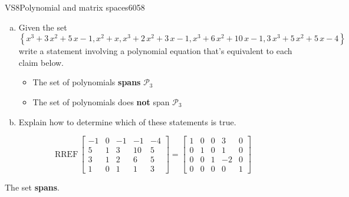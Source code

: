 \begin{exercise}{VS8}{Polynomial and matrix spaces}{6058} 
\begin{exerciseStatement} 

\begin{enumerate}[(a)]
\item  

 Given the set \[\left\{ x^{3} + 3 \, x^{2} + 5 \, x - 1 , x^{2} + x , x^{3} + 2 \, x^{2} + 3 \, x - 1 , x^{3} + 6 \, x^{2} + 10 \, x - 1 , 3 \, x^{3} + 5 \, x^{2} + 5 \, x - 4 \right\}\] write a statement involving a polynomial equation that's equivalent to each claim below. 

 

\begin{itemize}
\item  

 The set of polynomials \textbf{spans} \(\mathcal{P}_3\) 

 
\item  

 The set of polynomials does \textbf{not} span \(\mathcal{P}_3\) 

 
\end{itemize}

     
\item  

 Explain how to determine which of these statements is true. 

 
\end{enumerate}

     \end{exerciseStatement}
 \begin{exerciseAnswer} 

 \[
\mathrm{RREF}\, \left[\begin{array}{ccccc}
-1 & 0 & -1 & -1 & -4 \\
5 & 1 & 3 & 10 & 5 \\
3 & 1 & 2 & 6 & 5 \\
1 & 0 & 1 & 1 & 3
\end{array}\right] = \left[\begin{array}{ccccc}
1 & 0 & 0 & 3 & 0 \\
0 & 1 & 0 & 1 & 0 \\
0 & 0 & 1 & -2 & 0 \\
0 & 0 & 0 & 0 & 1
\end{array}\right]
            \] 

 

 The set \textbf{spans}. 

 \end{exerciseAnswer}
 \end{exercise}


